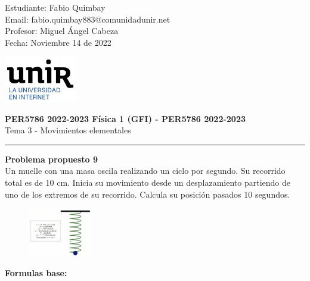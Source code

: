 \documentclass[11pt,letterpaper]{article}
\begin{document}
\pagestyle{plain}

\begin{flushleft}
Estudiante: Fabio Quimbay\\
Email: fabio.quimbay883@comunidadunir.net\\
Profesor: Miguel Ángel Cabeza\\
Fecha: Noviembre 14 de 2022\\
\end{flushleft}

\begin{flushright}\vspace{-20mm}
\includegraphics[height=2cm]{logo.png}
\end{flushright}
 
\begin{center}\vspace{0cm}
\textbf{\large PER5786 2022-2023  Física 1 (GFI) - PER5786 2022-2023}\\
 Tema 3 - Movimientos elementales
\end{center}

 
\rule{\linewidth}{0.1mm}

\bigskip
\bigskip

\textbf{Problema propuesto 9}\\

Un muelle con una masa oscila realizando un ciclo por segundo. Su recorrido total es de 10 cm. Inicia su movimiento desde un desplazamiento partiendo de uno de los extremos de su recorrido. Calcula su posición pasados 10 segundos.

\begin{figure}
\begin{center}
\includegraphics[width=0.25\textwidth]{problema_9.png}
\end{center}
\end{figure}

\textbf{Formulas base:}\\
\end{document}
